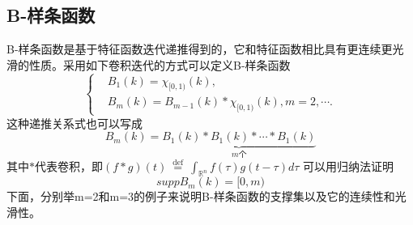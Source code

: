 \subsection{B-样条函数}
B-样条函数\cite{prochazkova2005derivative}是基于特征函数迭代递推得到的，它和特征函数相比具有更连续更光滑的性质。采用如下卷积迭代的方式可以定义B-样条函数
\begin{equation}
    \left\{\begin{matrix} 
&B_{1}(k)=\chi_{\lbrack0,1)}(k),\\
&B_{m}(k)=B_{m-1}(k)\ast\chi_{\lbrack0,1)}(k),m=2,\cdots.\label{b-spline}%
\end{matrix}\right. 
\end{equation}
这种递推关系式也可以写成
\begin{equation}
    B_{m}(k)=\underbrace{B_1(k) * B_{1}(k) * \cdots * B_{1}(k)}_{m \text{个}}
\end{equation}
其中$*$代表卷积，即$(f * g)(t) \stackrel{\text { def }}{=} \int_{\mathbb{R}^{n}} f(\tau) g(t-\tau) d \tau$
可以用归纳法证明
\begin{equation}
    supp B_{m}(k)=[0,m)
\end{equation}
下面，分别举m=2和m=3的例子来说明B-样条函数的支撑集以及它的连续性和光滑性。

